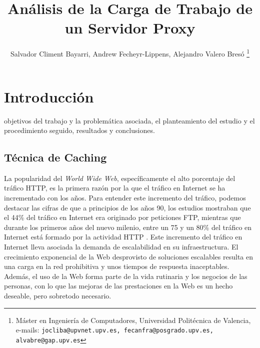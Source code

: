 \documentclass[twocolumn,twoside]{Jornadas}
\begin{document}
\title{Análisis de la Carga de Trabajo de un Servidor Proxy}

\author{%
     Salvador Climent Bayarri, %
     Andrew Fecheyr-Lippens, %
     Alejandro Valero Bresó%
	\thanks{Máster en Ingeniería de Computadores, Universidad Politécnica de Valencia, e-mails: {\tt jocliba@upvnet.upv.es, fecanfra@posgrado.upv.es, alvabre@gap.upv.es}}
     }

\maketitle
\markboth{}{}
\pagestyle{empty}
\thispagestyle{empty} %

\begin{abstract}

\end{abstract}

\begin{keywords}

\end{keywords}

\section{Introducción}
\label{intro}

 objetivos del trabajo y la problemática asociada, el planteamiento
del estudio y el procedimiento seguido, resultados y conclusiones.

\subsection{Técnica de Caching}

La popularidad del \emph{World Wide Web}, específicamente el alto porcentaje del tráfico HTTP, es la primera razón por la que el tráfico en Internet se ha incrementado con los años. Para entender este incremento del tráfico, podemos destacar las cifras de que a principios de los años 90, los estudios mostraban que el 44\% del tráfico en Internet era originado por peticiones FTP, mientras que durante los primeros años del nuevo milenio, entre un 75 y un 80\% del tráfico en Internet está formado por la actividad HTTP \cite{barish}. Este incremento del tráfico en Internet lleva asociada la demanda de escalabilidad en su infraestructura. El crecimiento exponencial de la Web desprovisto de soluciones escalables resulta en una carga en la red prohibitiva y unos tiempos de respuesta inaceptables. Además, el uso de la Web forma parte de la vida rutinaria y los negocios de las personas, con lo que las mejoras de las prestaciones en la Web es un hecho deseable, pero sobretodo necesario.
\end{document}
